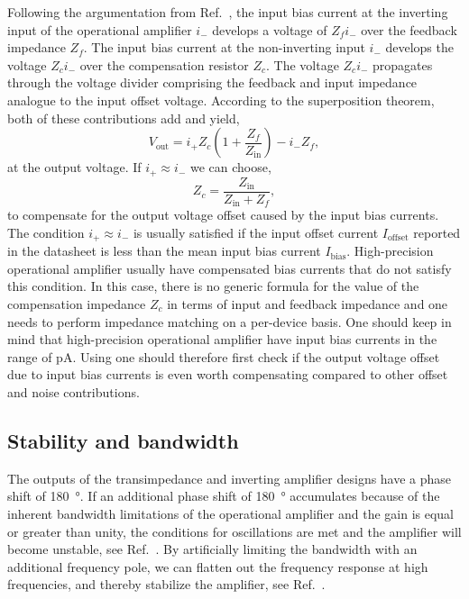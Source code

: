Following the argumentation from Ref.~\cite[p.~383]{Terrel96}, the input bias current at the inverting input of the operational amplifier $i_-$ develops a voltage of $Z_fi_-$ over the feedback impedance $Z_f$.
The input bias current at the non-inverting input $i_-$ develops the voltage $Z_ci_-$ over the compensation resistor $Z_c$.
The voltage $Z_ci_-$ propagates through the voltage divider comprising the feedback and input impedance analogue to the input offset voltage.
According to the superposition theorem, both of these contributions add and yield,
\begin{equation}
	V_\text{out}=i_+Z_c\left(1+\frac{Z_f}{Z_\text{in}}\right)-i_-Z_f
	\label{eq:input_bias_current},
\end{equation}
at the output voltage.
If $i_+\approx i_-$ we can choose,
\begin{equation}
	Z_c=\frac{Z_\text{in}}{Z_\text{in}+Z_f},
\end{equation}
 to compensate for the output voltage offset caused by the input bias currents.
The condition $i_+\approx i_-$ is usually satisfied if the input offset current $I_\text{offset}$ reported in the datasheet is less than the mean input bias current $I_\text{bias}$.
High-precision operational amplifier usually have compensated bias currents that do not satisfy this condition.
In this case, there is no generic formula for the value of the compensation impedance $Z_c$ in terms of input and feedback impedance and one needs to perform impedance matching on a per-device basis.
One should keep in mind that high-precision operational amplifier have input bias currents in the range of \si{\pico\ampere}.
Using  one should therefore first check if the output voltage offset due to input bias currents is even worth compensating compared to other offset and noise contributions.

\subsection{Stability and bandwidth}

The outputs of the transimpedance and inverting amplifier designs have a phase shift of \SI{180}{\degree}.
If an additional phase shift of \SI{180}{\degree} accumulates because of the inherent bandwidth limitations of the operational amplifier and the gain is equal or greater than unity, the conditions for oscillations are met and the amplifier will become unstable, see Ref.~\cite[p.~395]{Terrel96}.
By artificially limiting the bandwidth with an additional frequency pole, we can flatten out the frequency response at high frequencies, and thereby stabilize the amplifier, see Ref.~\cite[p.~184]{Kay12}.

